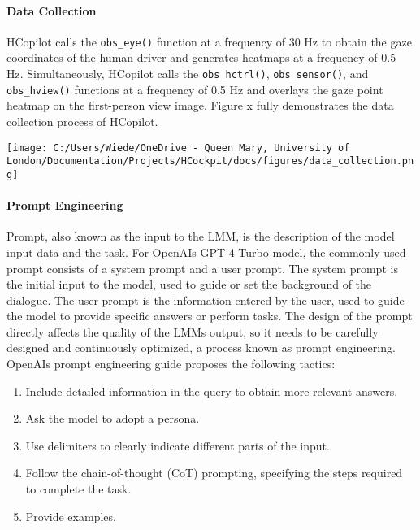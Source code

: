 \documentclass[
]{article}
\begin{document}
\paragraph{Data Collection}\label{data-collection}

HCopilot calls the \texttt{obs\_eye()} function at a frequency of 30 Hz
to obtain the gaze coordinates of the human driver and generates
heatmaps at a frequency of 0.5 Hz. Simultaneously, HCopilot calls the
\texttt{obs\_hctrl()}, \texttt{obs\_sensor()}, and \texttt{obs\_hview()}
functions at a frequency of 0.5 Hz and overlays the gaze point heatmap
on the first-person view image. Figure x fully demonstrates the data
collection process of HCopilot.

\texttt{[image: C:/Users/Wiede/OneDrive - Queen Mary, University of London/Documentation/Projects/HCockpit/docs/figures/data\_collection.png]}

\paragraph{Prompt Engineering}\label{prompt-engineering}

Prompt, also known as the input to the LMM, is the description of the
model input data and the task. For OpenAI\textquotesingle s GPT-4 Turbo
model, the commonly used prompt consists of a system prompt and a user
prompt. The system prompt is the initial input to the model, used to
guide or set the background of the dialogue. The user prompt is the
information entered by the user, used to guide the model to provide
specific answers or perform tasks. The design of the prompt directly
affects the quality of the LMM\textquotesingle s output, so it needs to
be carefully designed and continuously optimized, a process known as
prompt engineering. OpenAI\textquotesingle s prompt engineering guide
proposes the following tactics:

\begin{enumerate}
\def\labelenumi{\arabic{enumi}.}
\item
  Include detailed information in the query to obtain more relevant
  answers.
\item
  Ask the model to adopt a persona.
\item
  Use delimiters to clearly indicate different parts of the input.
\item
  Follow the chain-of-thought (CoT) prompting, specifying the steps
  required to complete the task.
\item
  Provide examples.
\end{enumerate}
\end{document}
